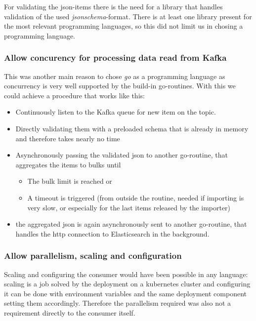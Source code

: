 For validating the json-items there is the need for a library that
handles validation of the used \emph{jsonschema}-format. There is at
least one library present for the most relevant programming languages,
so this did not limit us in chosing a programming language.

\subsubsection{Allow concurency for processing data read from
Kafka}\label{allow-concurency-for-processing-data-read-from-kafka-1}

This was another main reason to chose \emph{go} as a programming
language as concurrency is very well supported by the build-in
go-routines. With this we could achieve a procedure that works like
this:

\begin{itemize}
\tightlist
\item
  Continuously listen to the Kafka queue for new item on the topic.
\item
  Directly validating them with a preloaded schema that is already in
  memory and therefore takes nearly no time
\item
  Asynchronously passing the validated json to another go-routine, that
  aggregates the items to bulks until

  \begin{itemize}
  \tightlist
  \item
    The bulk limit is reached or
  \item
    A timeout is triggered (from outside the routine, needed if
    importing is very slow, or especially for the last items released by
    the importer)
  \end{itemize}
\item
  the aggregated json is again asynchronously sent to another
  go-routine, that handles the http connection to Elasticsearch in the
  background.
\end{itemize}

\subsubsection{Allow parallelism, scaling and
configuration}\label{allow-parallelism-scaling-and-configuration}

Scaling and configuring the consumer would have been possible in any
language: scaling is a job solved by the deployment on a kubernetes
cluster and configuring it can be done with environment variables and
the same deployment component setting them accordingly. Therefore the
parallelism required was also not a requirement directly to the consumer
itself.

